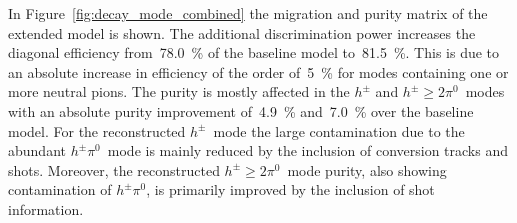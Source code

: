 In Figure~\ref{fig:decay_mode_combined} the migration and purity matrix of the
extended model is shown. The additional discrimination power increases the
diagonal efficiency from~\SI{78.0}{\percent} of the baseline model
to~\SI{81.5}{\percent}. This is due to an absolute increase in efficiency of the
order of~\SI{5}{\percent} for modes containing one or more neutral pions.
The purity is mostly affected in the $h^\pm$ and $h^\pm \geq 2\pi^0$~modes with
an absolute purity improvement of~\SI{4.9}{\percent} and~\SI{7.0}{\percent} over
the baseline model. For the reconstructed $h^\pm$~mode the large contamination
due to the abundant $h^\pm \pi^0$~mode is mainly reduced by the inclusion of
conversion tracks and shots.
Moreover, the reconstructed $h^\pm \geq 2\pi^0$~mode purity, also showing
contamination of $h^\pm \pi^0$, is primarily improved by the inclusion of shot
information.


